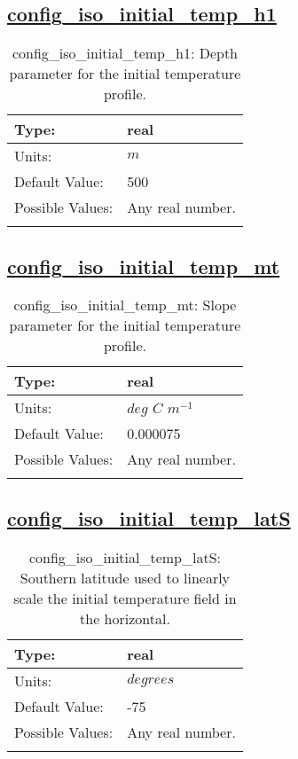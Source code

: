 \subsection[config\_iso\_initial\_temp\_h1]{\hyperref[sec:nm_tab_iso]{config\_iso\_initial\_temp\_h1}}
\label{subsec:nm_sec_config_iso_initial_temp_h1}
\begin{center}
\begin{longtable}{| p{2.0in} || p{4.0in} |}
    \hline
    Type: & real \\
    \hline
    Units: & $m$ \\
    \hline
    Default Value: & 500 \\
    \hline
    Possible Values: & Any real number. \\
    \hline
    \caption{config\_iso\_initial\_temp\_h1: Depth parameter for the initial temperature profile.}
\end{longtable}
\end{center}
\subsection[config\_iso\_initial\_temp\_mt]{\hyperref[sec:nm_tab_iso]{config\_iso\_initial\_temp\_mt}}
\label{subsec:nm_sec_config_iso_initial_temp_mt}
\begin{center}
\begin{longtable}{| p{2.0in} || p{4.0in} |}
    \hline
    Type: & real \\
    \hline
    Units: & $deg$ $C$ $m^{-1}$ \\
    \hline
    Default Value: & 0.000075 \\
    \hline
    Possible Values: & Any real number. \\
    \hline
    \caption{config\_iso\_initial\_temp\_mt: Slope parameter for the initial temperature profile.}
\end{longtable}
\end{center}
\subsection[config\_iso\_initial\_temp\_latS]{\hyperref[sec:nm_tab_iso]{config\_iso\_initial\_temp\_latS}}
\label{subsec:nm_sec_config_iso_initial_temp_latS}
\begin{center}
\begin{longtable}{| p{2.0in} || p{4.0in} |}
    \hline
    Type: & real \\
    \hline
    Units: & $degrees$ \\
    \hline
    Default Value: & -75 \\
    \hline
    Possible Values: & Any real number. \\
    \hline
    \caption{config\_iso\_initial\_temp\_latS: Southern latitude used to linearly scale the initial temperature field in the horizontal.}
\end{longtable}
\end{center}

